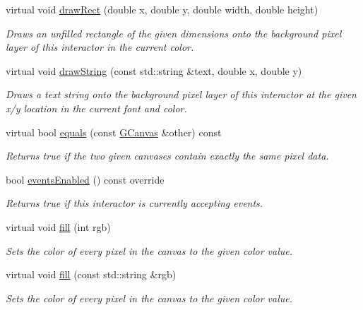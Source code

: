 \begin{DoxyCompactItemize}
virtual void \mbox{\hyperlink{classsgl_1_1GDrawingSurface_a4148e770ffc5474153aadd4814dbd708}{draw\+Rect}} (double x, double y, double width, double height)
\begin{DoxyCompactList}\small\item\em Draws an unfilled rectangle of the given dimensions onto the background pixel layer of this interactor in the current color. \end{DoxyCompactList}\item 
virtual void \mbox{\hyperlink{classsgl_1_1GDrawingSurface_ad4e8551a753a77135792bbee97013675}{draw\+String}} (const std\+::string \&text, double x, double y)
\begin{DoxyCompactList}\small\item\em Draws a text string onto the background pixel layer of this interactor at the given x/y location in the current font and color. \end{DoxyCompactList}\item 
virtual bool \mbox{\hyperlink{classsgl_1_1GCanvas_a7cf0de4c4124b7de747b9cc17edd6ab9}{equals}} (const \mbox{\hyperlink{classsgl_1_1GCanvas}{G\+Canvas}} \&other) const
\begin{DoxyCompactList}\small\item\em Returns true if the two given canvases contain exactly the same pixel data. \end{DoxyCompactList}\item 
bool \mbox{\hyperlink{classsgl_1_1GInteractor_a597a370b592e3737d38d9d2f4e2031ea}{events\+Enabled}} () const override
\begin{DoxyCompactList}\small\item\em Returns true if this interactor is currently accepting events. \end{DoxyCompactList}\item 
virtual void \mbox{\hyperlink{classsgl_1_1GCanvas_acaf90d64e4fea8f776e722976aeb5070}{fill}} (int rgb)
\begin{DoxyCompactList}\small\item\em Sets the color of every pixel in the canvas to the given color value. \end{DoxyCompactList}\item 
virtual void \mbox{\hyperlink{classsgl_1_1GCanvas_a02a5aa7f1474eeedd181e6e46b5eee65}{fill}} (const std\+::string \&rgb)
\begin{DoxyCompactList}\small\item\em Sets the color of every pixel in the canvas to the given color value. \end{DoxyCompactList}\item 

\end{DoxyCompactItemize}

